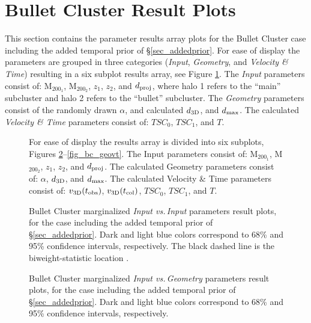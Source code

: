 \clearpage

\section{Bullet Cluster Result Plots}\label{sec_bcresults}

This section contains the parameter results array plots for the Bullet Cluster case including the added temporal prior of \S\ref{sec_addedprior}.
For ease of display the parameters are grouped in three categories (\emph{Input}, \emph{Geometry}, and \emph{Velocity \& Time}) resulting in a six subplot results array, see Figure \ref{fig_resultsarray}.
The \emph{Input} parameters consist of: M$_{200_1}$, M$_{200_2}$, $z_1$, $z_2$,	and $d_{\rm proj}$, where halo 1 refers to the ``main'' subcluster and halo 2 refers to the ``bullet'' subcluster.
The \emph{Geometry} parameters consist of the randomly drawn $\alpha$, and calculated $d_{\rm 3D}$, and $d_{\rm max}$.
The calculated \emph{Velocity \& Time} parameters consist of:  $TSC_0$, $TSC_1$, and $T$.

\begin{figure}[b]
\caption{
For ease of display the results array is divided into six subplots, Figures \ref{fig_bc_inin}--\ref{fig_bc_geovt}.
The Input parameters consist of: M$_{200_1}$, M$_{200_2}$, $z_1$, $z_2$,	and $d_{\rm proj}$.
The calculated Geometry parameters consist of: $\alpha$, $d_{\rm 3D}$, and $d_{\rm max}$.
The calculated Velocity \& Time parameters consist of:  $v_{\rm 3D}(t_{\rm obs})$, $v_{\rm 3D}(t_{\rm col})$, $TSC_0$, $TSC_1$, and $T$.
\label{fig_resultsarray}}
\end{figure}
\clearpage

\begin{figure}
\caption{Bullet Cluster marginalized \emph{Input vs.\,Input} parameters result plots, for the case including the added temporal prior of \S\ref{sec_addedprior}. Dark and light blue colors correspond to 68\% and 95\% confidence intervals, respectively.  The black dashed line is the biweight-statistic location \citep{Beers:1982dp}. 
\label{fig_bc_inin}}
\end{figure}

\begin{figure}
\caption{Bullet Cluster marginalized \emph{Input vs.\,Geometry} parameters result plots, for the case including the added temporal prior of \S\ref{sec_addedprior}.  Dark and light blue colors correspond to 68\% and 95\% confidence intervals, respectively.
\label{fig_bc_ingeo}}
\end{figure}

